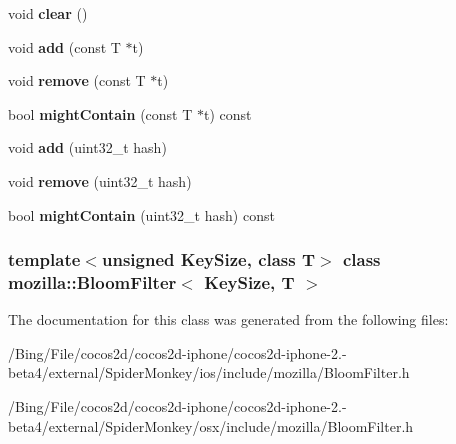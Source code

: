 \begin{DoxyCompactItemize}
\item 
\hypertarget{classmozilla_1_1_bloom_filter_abc5cd6c59a5767ed4b138a81823dce53}{void {\bfseries clear} ()}\label{classmozilla_1_1_bloom_filter_abc5cd6c59a5767ed4b138a81823dce53}

\item 
\hypertarget{classmozilla_1_1_bloom_filter_a989a79c95b14581de7bc4c920628cc58}{void {\bfseries add} (const T $\ast$t)}\label{classmozilla_1_1_bloom_filter_a989a79c95b14581de7bc4c920628cc58}

\item 
\hypertarget{classmozilla_1_1_bloom_filter_a63749f3f35c389f6a6e979b0dd98d3ca}{void {\bfseries remove} (const T $\ast$t)}\label{classmozilla_1_1_bloom_filter_a63749f3f35c389f6a6e979b0dd98d3ca}

\item 
\hypertarget{classmozilla_1_1_bloom_filter_a3779873bb2e7b2fac7fd8db471bb7a28}{bool {\bfseries might\-Contain} (const T $\ast$t) const }\label{classmozilla_1_1_bloom_filter_a3779873bb2e7b2fac7fd8db471bb7a28}

\item 
\hypertarget{classmozilla_1_1_bloom_filter_a4b6c046ad25b3419f025ab33400ba099}{void {\bfseries add} (uint32\-\_\-t hash)}\label{classmozilla_1_1_bloom_filter_a4b6c046ad25b3419f025ab33400ba099}

\item 
\hypertarget{classmozilla_1_1_bloom_filter_a20351a6b5b22946827a7827d5eb47dee}{void {\bfseries remove} (uint32\-\_\-t hash)}\label{classmozilla_1_1_bloom_filter_a20351a6b5b22946827a7827d5eb47dee}

\item 
\hypertarget{classmozilla_1_1_bloom_filter_a6e561afa4779ac43e950d0a3e37984fd}{bool {\bfseries might\-Contain} (uint32\-\_\-t hash) const }\label{classmozilla_1_1_bloom_filter_a6e561afa4779ac43e950d0a3e37984fd}

\end{DoxyCompactItemize}
\subsubsection*{template$<$unsigned Key\-Size, class T$>$ class mozilla\-::\-Bloom\-Filter$<$ Key\-Size, T $>$}



The documentation for this class was generated from the following files\-:\begin{DoxyCompactItemize}
\item 
/\-Bing/\-File/cocos2d/cocos2d-\/iphone/cocos2d-\/iphone-\/2.-\/beta4/external/\-Spider\-Monkey/ios/include/mozilla/Bloom\-Filter.\-h\item 
/\-Bing/\-File/cocos2d/cocos2d-\/iphone/cocos2d-\/iphone-\/2.-\/beta4/external/\-Spider\-Monkey/osx/include/mozilla/Bloom\-Filter.\-h\end{DoxyCompactItemize}
